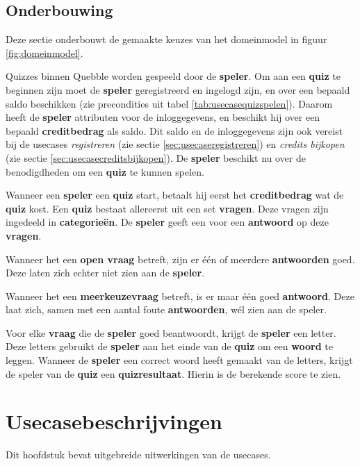 \subsection{Onderbouwing}
Deze sectie onderbouwt de gemaakte keuzes van het domeinmodel in figuur \ref{fig:domeinmodel}.

Quizzes binnen Quebble worden gespeeld door de \textbf{speler}. Om aan een \textbf{quiz} te beginnen zijn moet de \textbf{speler} geregistreerd en ingelogd zijn, en over een bepaald saldo beschikken (zie precondities uit tabel \ref{tab:usecasequizspelen}). Daarom heeft de \textbf{speler} attributen voor de inloggegevens, en beschikt hij over een bepaald \textbf{creditbedrag} als saldo. Dit saldo en de inloggegevens zijn ook vereist bij de usecases \textit{registreren} (zie sectie \ref{sec:usecaseregistreren}) en \textit{credits bijkopen} (zie sectie \ref{sec:usecasecreditsbijkopen}). De \textbf{speler} beschikt nu over de benodigdheden om een \textbf{quiz} te kunnen spelen.

Wanneer een \textbf{speler} een \textbf{quiz} start, betaalt hij eerst het \textbf{creditbedrag} wat de \textbf{quiz} kost. Een \textbf{quiz} bestaat allereerst uit een set \textbf{vragen}. Deze vragen zijn ingedeeld in \textbf{categorieën}. De \textbf{speler} geeft een voor een \textbf{antwoord} op deze \textbf{vragen}.

Wanneer het een \textbf{open vraag} betreft, zijn er één of meerdere \textbf{antwoorden} goed. Deze laten zich echter niet zien aan de \textbf{speler}.

Wanneer het een \textbf{meerkeuzevraag} betreft, is er maar één goed \textbf{antwoord}. Deze laat zich, samen met een aantal foute \textbf{antwoorden}, wél zien aan de speler.

Voor elke \textbf{vraag} die de \textbf{speler} goed beantwoordt, krijgt de \textbf{speler} een letter. Deze letters gebruikt de \textbf{speler} aan het einde van de \textbf{quiz} om een \textbf{woord} te leggen. Wanneer de \textbf{speler} een correct woord heeft gemaakt van de letters, krijgt de speler van de \textbf{quiz} een \textbf{quizresultaat}. Hierin is de berekende score te zien.

\clearpage\section{Usecasebeschrijvingen}
Dit hoofdstuk bevat uitgebreide uitwerkingen van de usecases.

